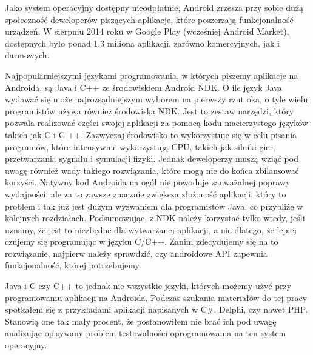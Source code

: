 Jako system operacyjny dostępny nieodpłatnie, Android zrzesza przy sobie dużą społeczność deweloperów piszących aplikacje, które poszerzają funkcjonalność urządzeń. W sierpniu 2014 roku w Google Play (wcześniej Android Market), dostępnych było ponad 1,3 miliona aplikacji, zarówno komercyjnych, jak i darmowych.

Najpopularniejszymi językami programowania, w których piszemy aplikacje na Androida, są Java i C++ ze środowiskiem Android NDK. O ile język Java wydawać się może najrozsądniejszym wyborem na pierwszy rzut oka, o tyle wielu programistów używa również środowiska NDK. Jest to zestaw narzędzi, który pozwala realizować części swojej aplikacji za pomocą kodu macierzystego języków takich jak C i C ++. Zazwyczaj środowisko to wykorzystuje się w celu pisania programów, które intensywnie wykorzystują CPU, takich jak silniki gier, przetwarzania sygnału i symulacji fizyki. Jednak deweloperzy muszą wziąć pod uwagę również wady takiego rozwiązania, które mogą nie do końca zbilansować korzyści. Natywny kod Androida na ogół nie powoduje zauważalnej poprawy wydajności, ale za to zawsze znacznie zwiększa złożoność aplikacji, który to problem i tak już jest dużym wyzwaniem dla programistów Java, co przybliżę w kolejnych rozdziałach. Podsumowując, z NDK należy korzystać tylko wtedy, jeśli uznamy, że jest to niezbędne dla wytwarzanej aplikacji, a nie dlatego, że lepiej czujemy się programując w języku C/C++. Zanim zdecydujemy się na to rozwiązanie, najpierw należy sprawdzić, czy androidowe API zapewnia funkcjonalność, której potrzebujemy.

Java i C czy C++ to jednak nie wszystkie języki, których możemy użyć przy programowaniu aplikacji na Androida. Podczas szukania materiałów do tej pracy spotkałem się z przykładami aplikacji napisanych w C\#, Delphi, czy nawet PHP. Stanowią one tak mały procent, że postanowiłem nie brać ich pod uwagę analizując opisywany problem testowalności oprogramowania na ten system operacyjny.





